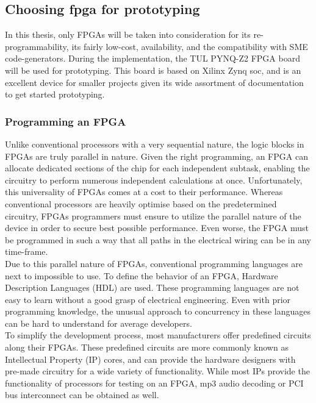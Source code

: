 \subsection{Choosing \gls{fpga} for prototyping}
In this thesis, only FPGAs will be taken into consideration for
its re-programmability, its fairly low-cost, availability, and the
compatibility with SME code-generators. During the implementation, the
TUL PYNQ\texttrademark-Z2 FPGA board will be used for prototyping. This
board is based on Xilinx Zynq \gls{soc}, and is an excellent device
for smaller projects given its wide assortment of documentation to get
started prototyping.\cite{tul_pynq}





\subsubsection{Programming an FPGA}
Unlike conventional processors with a very sequential nature, the logic blocks
in FPGAs are truly parallel in nature. Given the right programming, an FPGA can
allocate 
dedicated sections of the chip for each independent subtask, enabling
the circuitry to perform numerous independent calculations at once\cite{ni_fpga}.
Unfortunately, this universality of FPGAs comes at a cost to their performance.
Whereas conventional processors are heavily optimise based on the predetermined
circuitry, FPGAs programmers must ensure to utilize the parallel nature of the
device in order to secure best possible performance.
Even worse, the FPGA must
be programmed in such a way that all paths in the electrical wiring can be
in any time-frame.\\
Due to this parallel nature of FPGAs, conventional programming languages are
next to impossible to use. To define the behavior of an FPGA, Hardware
Description Languages (HDL) are used. These programming languages are not easy
to learn without a good grasp of electrical engineering. Even with prior
programming knowledge, the unusual approach to concurrency in these languages
can be hard to understand for average developers.\\
To simplify the development process, most manufacturers offer predefined
circuits along their FPGAs. These predefined circuits are more commonly known
as Intellectual Property (IP) cores, and can provide the hardware designers
with pre-made circuitry for a wide variety of functionality. While most IPs
provide the functionality of processors for testing
on an FPGA, mp3 audio
decoding or PCI bus interconnect can be obtained as well\cite{fpga_for_dummies}.



